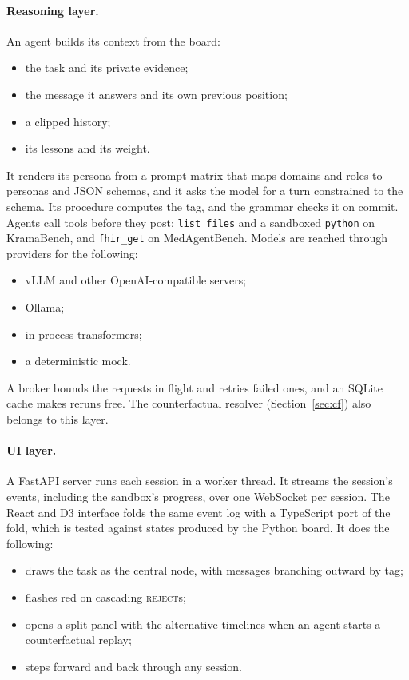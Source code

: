 \documentclass[11pt]{article}
\begin{document}
\paragraph{Reasoning layer.} An agent builds its context from the board:
\begin{itemize}
\item the task and its private evidence;
\item the message it answers and its own previous position;
\item a clipped history;
\item its lessons and its weight.
\end{itemize}
It renders its persona from a prompt matrix that maps domains and roles to personas and JSON
schemas, and it asks the model for a turn constrained to the schema. Its procedure computes the
tag, and the grammar checks it on commit. Agents call tools before they post: \texttt{list\_files}
and a sandboxed \texttt{python} on KramaBench, and \texttt{fhir\_get} on MedAgentBench. Models are
reached through providers for the following:
\begin{itemize}
\item vLLM and other OpenAI-compatible servers;
\item Ollama;
\item in-process transformers;
\item a deterministic mock.
\end{itemize}
A broker bounds the requests in flight and retries failed ones, and an SQLite cache makes reruns
free. The counterfactual resolver (Section~\ref{sec:cf}) also belongs to this layer.

\paragraph{UI layer.} A FastAPI server runs each session in a worker thread. It streams the
session's events, including the sandbox's progress, over one WebSocket per session. The React
and D3 interface folds the same event log with a TypeScript port of the fold, which is tested
against states produced by the Python board. It does the following:
\begin{itemize}
\item draws the task as the central node, with messages branching outward by tag;
\item flashes red on cascading \textsc{reject}s;
\item opens a split panel with the alternative timelines when an agent starts a counterfactual
  replay;
\item steps forward and back through any session.
\end{itemize}
\end{document}
